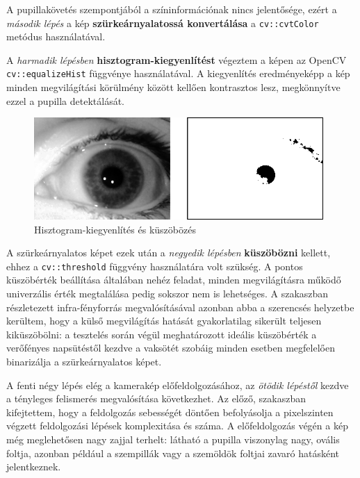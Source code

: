 A pupillakövetés szempontjából a színinformációnak nincs jelentősége, ezért a \emph{második lépés} a kép \textbf{szürkeárnyalatossá konvertálása} a \texttt{cv::cvtColor} metódus használatával.

A \emph{harmadik lépésben} \textbf{hisztogram-kiegyenlítést} végeztem a képen az OpenCV \texttt{cv::equalizeHist} függvénye használatával. A kiegyenlítés eredményeképp a kép minden megvilágítási körülmény között kellően kontrasztos lesz, megkönnyítve ezzel a pupilla detektálását.

\begin{figure}[!ht]
\centering
\includegraphics[width=110mm, keepaspectratio]{figures/eq_thresh.png}
\caption{Hisztogram-kiegyenlítés és küszöbözés}
\label{fig:eq_thresh}
\end{figure}

A szürkeárnyalatos képet ezek után a \emph{negyedik lépésben} \textbf{küszöbözni} kellett, ehhez a \texttt{cv::threshold} függvény használatára volt szükség. A pontos küszöbérték beállítása általában nehéz feladat, minden megvilágításra működő univerzális érték megtalálása pedig sokszor nem is lehetséges. A  szakaszban részletezett infra-fényforrás megvalósításával azonban abba a szerencsés helyzetbe kerültem, hogy a külső megvilágítás hatását gyakorlatilag sikerült teljesen kiküszöbölni: a tesztelés során végül meghatározott ideális küszöbérték a verőfényes napsütéstől kezdve a vaksötét szobáig minden esetben megfelelően binarizálja a szürkeárnyalatos képet.

\bigskip

A fenti négy lépés elég a kamerakép előfeldolgozásához, az \emph{ötödik lépéstől} kezdve a tényleges felismerés megvalósítása következhet. Az előző,  szakaszban kifejtettem, hogy a feldolgozás sebességét döntően befolyásolja a pixelszinten végzett feldolgozási lépések komplexitása és száma. A előfeldolgozás végén a kép még meglehetősen nagy zajjal terhelt: látható a pupilla viszonylag nagy, ovális foltja, azonban például a szempillák vagy a szemöldök foltjai zavaró hatásként jelentkeznek.

